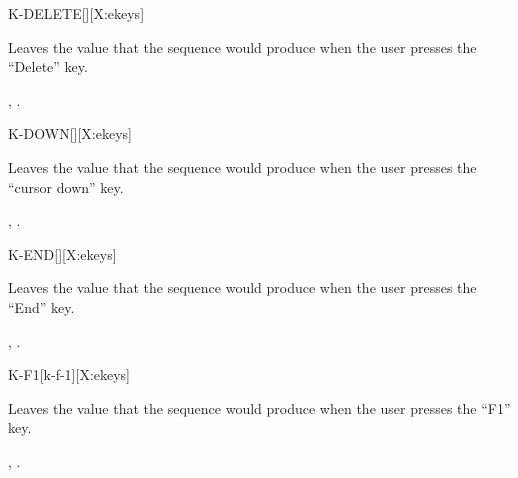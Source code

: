 \begin{worddef*}{}{K-DELETE}[][X:ekeys]
\item {}

	Leaves the value  that the sequence 
	 would produce when the user presses the
	``Delete'' key.


\see {},
	.
\end{worddef*}


\begin{worddef*}{}{K-DOWN}[][X:ekeys]
\item {}

	Leaves the value  that the sequence 
	 would produce when the user presses the
	``cursor down'' key.


\see {},
	.
\end{worddef*}


\begin{worddef*}{}{K-END}[][X:ekeys]
\item {}

	Leaves the value  that the sequence 
	 would produce when the user presses the
	``End'' key.


\see {},
	.
\end{worddef*}


\begin{worddef*}{}{K-F1}[k-f-1][X:ekeys]
\item {}

	Leaves the value  that the sequence 
	 would produce when the user presses the
	``F1'' key.


\see {},
	.
\end{worddef*}


